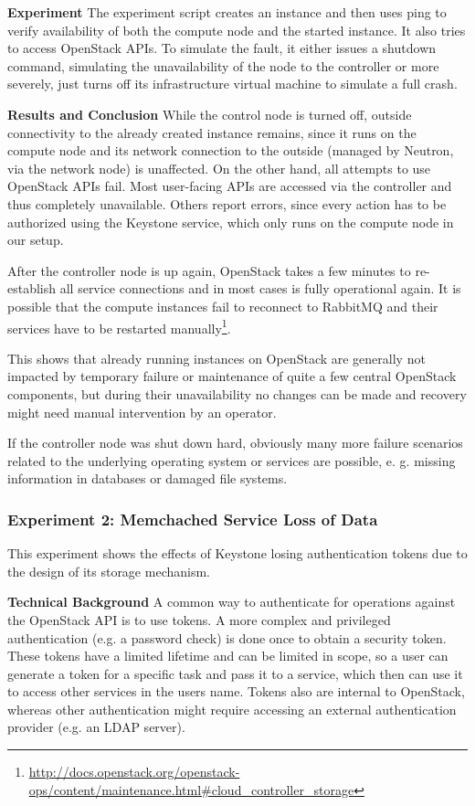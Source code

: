 \documentclass[conference]{IEEEtran}
\begin{document}
\textbf{Experiment}
The experiment script creates an instance and then uses ping to verify availability of both the compute node and the started instance. It also tries to access OpenStack APIs. To simulate the fault, it either issues a shutdown command, simulating the unavailability of the node to the controller or more severely, just turns off its infrastructure virtual machine to simulate a full crash.

\textbf{Results and Conclusion}
While the control node is turned off, outside connectivity to the already created instance remains, since it runs on the compute node and its network connection to the outside (managed by Neutron, via the network node) is unaffected. On the other hand, all attempts to use OpenStack APIs fail. Most user-facing APIs are accessed via the controller and thus completely unavailable. Others report errors, since every action has to be authorized using the Keystone service, which only runs on the compute node in our setup.

After the controller node is up again, OpenStack takes a few minutes to re-establish all service connections and in most cases is fully operational again. It is possible that the compute instances fail to reconnect to RabbitMQ and their services have to be restarted manually\footnote{\url{http://docs.openstack.org/openstack-ops/content/maintenance.html\#cloud_controller_storage}}. 

This shows that already running instances on OpenStack are generally not impacted by temporary failure or maintenance of quite a few central OpenStack components, but during their unavailability no changes can be made and recovery might need manual intervention by an operator. 

If the controller node was shut down hard, obviously many more failure scenarios related to the underlying operating system or services are possible, e. g. missing information in databases or damaged file systems.

\subsubsection{Experiment 2: Memchached Service Loss of Data}
This experiment shows the effects of Keystone losing authentication tokens due to the design of its storage mechanism.

\textbf{Technical Background}
A common way to authenticate for operations against the OpenStack API is to use tokens. A more complex and privileged authentication (e.g. a password check) is done once to obtain a security token. These tokens have a limited lifetime and can be limited in scope, so a user can generate a token for a specific task and pass it to a service, which then can use it to access other services in the users name. Tokens also are internal to OpenStack, whereas other authentication might require accessing an external authentication provider (e.g. an LDAP server).
\end{document}
